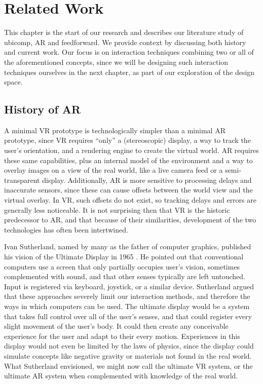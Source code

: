 \chapter{Related Work} \label{chap:relat}
This chapter is the start of our research and describes our literature study of ubicomp, AR and feedforward. We provide context by discussing both history and current work. Our focus is on interaction techniques combining two or all of the aforementioned concepts, since we will be designing such interaction techniques ourselves in the next chapter, as part of our exploration of the design space.

\section{History of AR} \label{sec:relat:ar}
A minimal VR prototype is technologically simpler than a minimal AR prototype, since VR requires ``only'' a (stereoscopic) display, a way to track the user's orientation, and a rendering engine to create the virtual world. AR requires these same capabilities, plus an internal model of the environment and a way to overlay images on a view of the real world, like a live camera feed or a semi-transparent display. Additionally, AR is more sensitive to processing delays and inaccurate sensors, since these can cause offsets between the world view and the virtual overlay. In VR, such offsets do not exist, so tracking delays and errors are generally less noticeable. It is not surprising then that VR is the historic predecessor to AR, and that because of their similarities, development of the two technologies has often been intertwined.

Ivan Sutherland, named by many as the father of computer graphics, published his vision of the Ultimate Display in 1965 \cite{sutherland1965ultimate}. He pointed out that conventional computers use a screen that only partially occupies user's vision, sometimes complemented with sound, and that other senses typically are left untouched. Input is registered via keyboard, joystick, or a similar device. Sutherland argued that these approaches severely limit our interaction methods, and therefore the ways in which computers can be used. The ultimate display would be a system that takes full control over all of the user's senses, and that could register every slight movement of the user's body. It could then create any conceivable experience for the user and adapt to their every motion. Experiences in this display would not even be limited by the laws of physics, since the display could simulate concepts like negative gravity or materials not found in the real world. What Sutherland envisioned, we might now call the ultimate VR system, or the ultimate AR system when complemented with knowledge of the real world.

